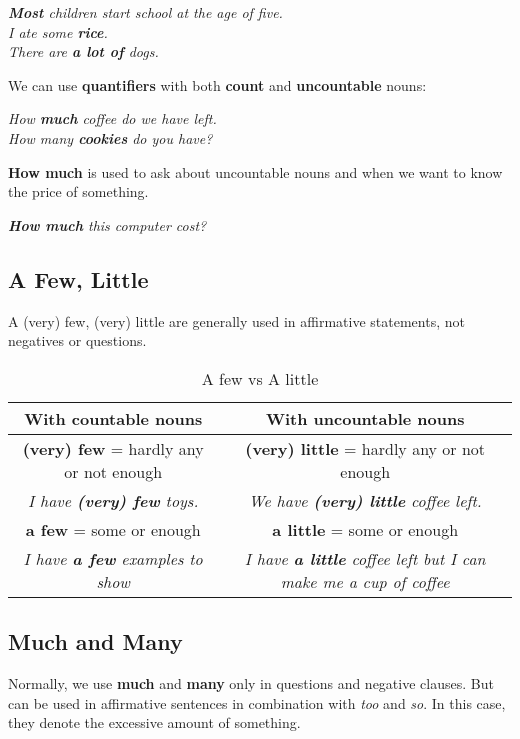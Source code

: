 \documentclass[hidelinks,10pt,a4paper]{article}
\begin{document}
\begin{center}
	\textit{ \textbf{Most} children start school at the age of five. \\
		I ate some \textbf{rice}. \\
		There are \textbf{a lot of} dogs. }
\end{center}

We can use \textbf{quantifiers} with both \textbf{count} and \textbf{uncountable} nouns:
 \begin{center}
 	\textit{How \textbf{much} coffee do we have left. \\
	 		How many \textbf{cookies}  do you have?}
 \end{center}

\textbf{How much} is used to ask about uncountable nouns and when we want to know the price of something.
\begin{center}
	\textit{ \textbf{How much} this computer cost? }
\end{center}

\subsection{A Few,  Little}
A (very) few, (very) little are generally used in affirmative statements, not negatives or questions.
\begin{table}[h]
	\begin{center}
	\begin{tabular}{|c|c|}
		\hline
		\textbf{With countable nouns} & \textbf{With uncountable nouns} \\ \hline
		\textbf{(very) few} = hardly any or not enough & \textbf{(very) little} = hardly any or not enough \\ \hline
		\textit{I have \textbf{(very) few} toys.} & \textit{We have \textbf{(very) little} coffee left. } \\ \hline
		\textbf{a few} = some or enough & \textbf{a little} = some or enough \\ \hline
		\textit{I have \textbf{a few} examples to show } & \textit{I have \textbf{a little} coffee left but I can make me a cup of coffee } \\ \hline
	\end{tabular}
\end{center}
\caption{\label{tab:quantifiers1}A few vs A little}
\end{table}

\subsection{Much and Many}
Normally, we use \textbf{much} and \textbf{many} only in questions and negative clauses. But can be used in affirmative sentences in combination with \textit{too} and \textit{so}. In this case, they denote the excessive amount of something.
\end{document}
